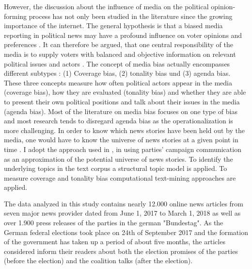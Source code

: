 \documentclass[12pt,a4paper,notitlepage]{article}
\begin{document}
However, the discussion about the influence of media on the political opinion-forming process has not only been studied in the literature since the growing importance of the internet. The general hypothesis is that a biased media reporting in political news may have a profound influence on voter opinions and preferences \citep{ferree_four_2002, mccombs_look_2005, eberl_one_2017}. It can therefore be argued, that one central responsibility of the media is to supply voters with balanced and objective information on relevant political issues and actors \citep{stromback_four_2008, eberl_one_2017}. The concept of media bias actually encompasses different subtypes \citep{dalessio_media_2000, eberl_one_2017, junque_de_fortuny_media_2012}: (1) Coverage bias, (2) tonality bias und (3) agenda bias. These three concepts measure how often political actors appear in the media (coverage bias), how they are evaluated (tonality bias) and whether they are able to present their own political positions and talk about their issues in the media (agenda bias). Most of the literature on media bias focuses on one type of bias and most research tends to disregard agenda bias as the operationalization is more challenging. In order to know which news stories have been held out by the media, one would have to know the universe of news stories at a given point in time \citep{dalessio_media_2000}. I adopt the approach used in \citet{eberl_one_2017}, in using parties' campaign communication as an approximation of the potential universe of news stories. To identify the underlying topics in the text corpus a structural topic model is applied. To measure coverage and tonality bias computational text-mining approaches are applied. 

The data analyzed in this study contains nearly 12.000 online news articles from seven major news provider dated from June 1, 2017 to March 1, 2018 as well as over 1.900 press releases of the parties in the german "Bundestag". As the German federal elections took place on 24th of September 2017 and the formation of the government has taken up a period of about five months, the articles considered inform their readers about both the election promises of the parties (before the election) and the coalition talks (after the election). 
\end{document}
